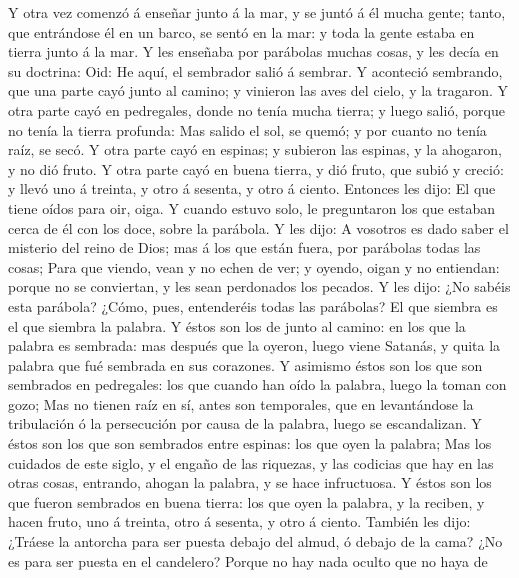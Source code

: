  Y otra vez comenzó á enseñar junto á la mar, y se juntó á
él mucha gente; tanto, que entrándose él en un barco, se sentó en la
mar: y toda la gente estaba en tierra junto á la mar.  Y les
enseñaba por parábolas muchas cosas, y les decía en su doctrina:
 Oid: He aquí, el sembrador salió á sembrar.  Y
aconteció sembrando, que una parte cayó junto al camino; y vinieron las
aves del cielo, y la tragaron.  Y otra parte cayó en
pedregales, donde no tenía mucha tierra; y luego salió, porque no tenía
la tierra profunda:  Mas salido el sol, se quemó; y por
cuanto no tenía raíz, se secó.  Y otra parte cayó en
espinas; y subieron las espinas, y la ahogaron, y no dió fruto.
 Y otra parte cayó en buena tierra, y dió fruto, que subió y
creció: y llevó uno á treinta, y otro á sesenta, y otro á ciento.
 Entonces les dijo: El que tiene oídos para oir, oiga.
 Y cuando estuvo solo, le preguntaron los que estaban cerca
de él con los doce, sobre la parábola.  Y les dijo: A
vosotros es dado saber el misterio del reino de Dios; mas á los que
están fuera, por parábolas todas las cosas;  Para que
viendo, vean y no echen de ver; y oyendo, oigan y no entiendan: porque
no se conviertan, y les sean perdonados los pecados.  Y les
dijo: ¿No sabéis esta parábola? ¿Cómo, pues, entenderéis todas las
parábolas?  El que siembra es el que siembra la palabra.
 Y éstos son los de junto al camino: en los que la palabra
es sembrada: mas después que la oyeron, luego viene Satanás, y quita la
palabra que fué sembrada en sus corazones.  Y asimismo
éstos son los que son sembrados en pedregales: los que cuando han oído
la palabra, luego la toman con gozo;  Mas no tienen raíz en
sí, antes son temporales, que en levantándose la tribulación ó la
persecución por causa de la palabra, luego se escandalizan.
 Y éstos son los que son sembrados entre espinas: los que
oyen la palabra;  Mas los cuidados de este siglo, y el
engaño de las riquezas, y las codicias que hay en las otras cosas,
entrando, ahogan la palabra, y se hace infructuosa.  Y
éstos son los que fueron sembrados en buena tierra: los que oyen la
palabra, y la reciben, y hacen fruto, uno á treinta, otro á sesenta, y
otro á ciento.  También les dijo: ¿Tráese la antorcha para
ser puesta debajo del almud, ó debajo de la cama? ¿No es para ser puesta
en el candelero?  Porque no hay nada oculto que no haya de
